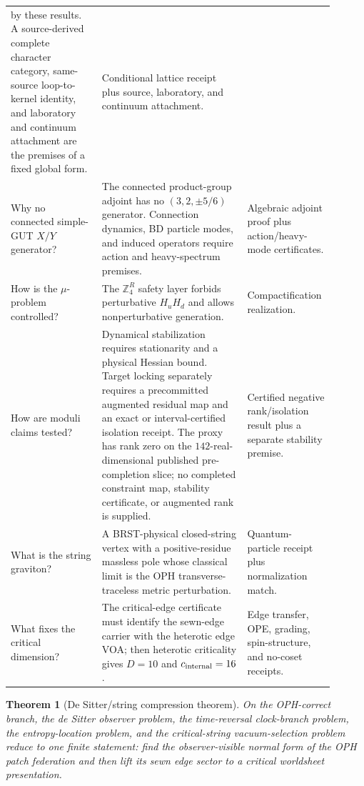 \documentclass[11pt]{article}
\newtheorem{theorem}{Theorem}[section]
\theoremstyle{remark}
\theoremstyle{plain}
\newcommand{\ZfourR}{\mathbb Z_4^R}
\begin{document}
\begin{longtable}{L{0.27\linewidth}L{0.43\linewidth}L{0.20\linewidth}}
by these results. A source-derived complete character category, same-source
loop-to-kernel identity, and laboratory and continuum attachment are the
premises of a fixed global form. &
Conditional lattice receipt plus source, laboratory, and continuum attachment. \\
Why no connected simple-GUT \(X/Y\) generator? & The connected product-group adjoint has no
\((3,2,\pm5/6)\) generator. Connection dynamics, BD particle modes, and induced operators require
action and heavy-spectrum premises. & Algebraic adjoint proof plus action/heavy-mode certificates. \\
How is the \(\mu\)-problem controlled? & The \(\ZfourR\) safety layer forbids perturbative
\(H_uH_d\) and allows nonperturbative generation. & Compactification realization. \\
How are moduli claims tested? & Dynamical stabilization requires stationarity and a physical
Hessian bound. Target locking separately requires a precommitted augmented residual map and an
exact or interval-certified isolation receipt. The proxy has rank zero on the \(142\)-real-dimensional
published pre-completion slice; no completed constraint map, stability certificate, or augmented
rank is supplied. & Certified negative rank/isolation result plus a separate stability premise. \\
What is the string graviton? & A BRST-physical closed-string vertex with a positive-residue
massless pole whose classical limit is the OPH transverse-traceless metric perturbation. &
Quantum-particle receipt plus normalization match. \\
What fixes the critical dimension? & The critical-edge certificate must identify the sewn-edge carrier
with the heterotic edge VOA; then heterotic criticality gives \(D=10\) and
\(c_{\rm internal}=16\). & Edge transfer, OPE, grading, spin-structure, and no-coset receipts. \\
\bottomrule
\end{longtable}

\begin{theorem}[De Sitter/string compression theorem]
On the OPH-correct branch, the de Sitter observer problem, the time-reversal clock-branch
problem, the entropy-location problem, and the critical-string vacuum-selection problem reduce to
one finite statement: find the observer-visible normal form of the OPH patch federation and then
lift its sewn edge sector to a critical worldsheet presentation.
\end{theorem}
\end{document}
